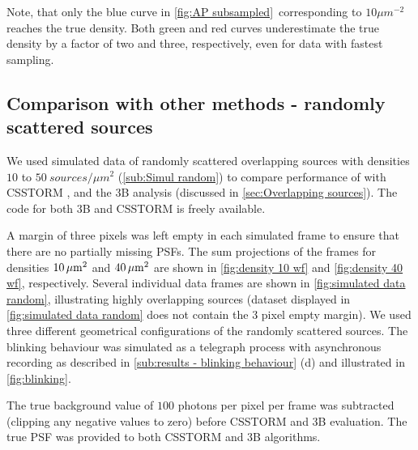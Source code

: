 Note, that only the blue curve in \autoref{fig:AP subsampled}\aaa\ corresponding to $10\unit{\mu m}^{-2}$ reaches the true density. Both green and red curves underestimate the true density by a factor of two and three, respectively, even for data with fastest sampling. 



\subsection{Comparison with other methods - randomly scattered sources\label{sub:results - comparison}} %
We used simulated data of randomly scattered overlapping sources with densities $10$ to $50\ \unit{sources/\mu m^{2}}$ (\autoref{sub:Simul random}) to compare performance of \inmf{} with CSSTORM \cite{Zhu2012}, and the 3B analysis \cite{Cox2011} (discussed in \autoref{sec:Overlapping sources}). The code for both 3B and CSSTORM is freely available.  

A margin of three pixels was left empty in each simulated frame to ensure that there are no partially missing PSFs. The sum projections of the frames for densities $10 \, \mathrm{\mu m}^{2}$ and $40 \, \mathrm{\mu m}^{2}$ are shown in \autoref{fig:density 10 wf} and \ref{fig:density 40 wf}, respectively. Several individual data frames are shown in \autoref{fig:simulated data random}, illustrating highly overlapping sources (dataset displayed in \autoref{fig:simulated data random} does not contain the 3 pixel empty margin). We used three different geometrical configurations of the randomly scattered sources. The blinking behaviour was simulated as a telegraph process with asynchronous recording as described in \autoref{sub:results - blinking behaviour} (d) and illustrated in \autoref{fig:blinking}\ddd.

The true background value of $100$ photons per pixel per frame was subtracted (clipping any negative values to zero) before CSSTORM and 3B evaluation. The true PSF was provided to both CSSTORM and 3B algorithms. 

